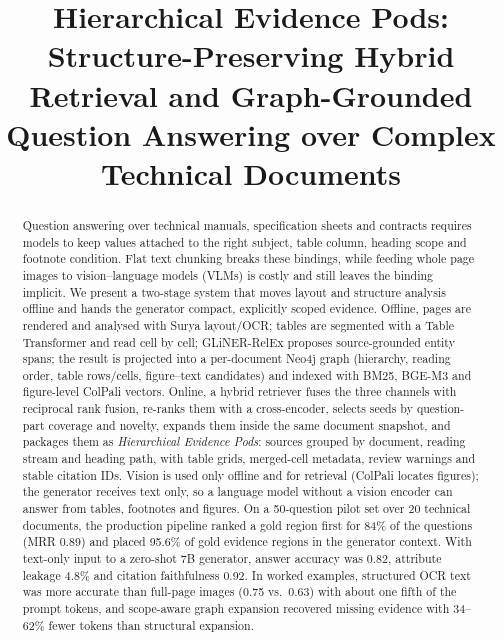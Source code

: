 \documentclass[conference]{IEEEtran}
\begin{document}
\title{Hierarchical Evidence Pods: Structure-Preserving Hybrid Retrieval and Graph-Grounded Question Answering over Complex Technical Documents}

\author{
\and
{}
}

\maketitle

\begin{abstract}
Question answering over technical manuals, specification sheets and contracts requires models to keep values attached to the right subject, table column, heading scope and footnote condition. Flat text chunking breaks these bindings, while feeding whole page images to vision--language models (VLMs) is costly and still leaves the binding implicit. We present a two-stage system that moves layout and structure analysis offline and hands the generator compact, explicitly scoped evidence. Offline, pages are rendered and analysed with Surya layout/OCR; tables are segmented with a Table Transformer and read cell by cell; GLiNER-RelEx proposes source-grounded entity spans; the result is projected into a per-document Neo4j graph (hierarchy, reading order, table rows/cells, figure--text candidates) and indexed with BM25, BGE-M3 and figure-level ColPali vectors. Online, a hybrid retriever fuses the three channels with reciprocal rank fusion, re-ranks them with a cross-encoder, selects seeds by question-part coverage and novelty, expands them inside the same document snapshot, and packages them as \emph{Hierarchical Evidence Pods}: sources grouped by document, reading stream and heading path, with table grids, merged-cell metadata, review warnings and stable citation IDs. Vision is used only offline and for retrieval (ColPali locates figures); the generator receives text only, so a language model without a vision encoder can answer from tables, footnotes and figures. On a 50-question pilot set over 20 technical documents, the production pipeline ranked a gold region first for 84\% of the questions (MRR 0.89) and placed 95.6\% of gold evidence regions in the generator context. With text-only input to a zero-shot 7B generator, answer accuracy was 0.82, attribute leakage 4.8\% and citation faithfulness 0.92. In worked examples, structured OCR text was more accurate than full-page images (0.75 vs.\ 0.63) with about one fifth of the prompt tokens, and scope-aware graph expansion recovered missing evidence with 34--62\% fewer tokens than structural expansion.
\end{abstract}
\end{document}
